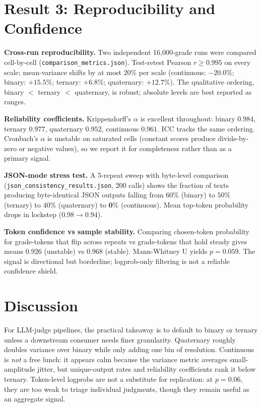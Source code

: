 \documentclass[11pt]{article}
\begin{document}
\section{Result 3: Reproducibility and Confidence}
\label{sec:r3}

\textbf{Cross-run reproducibility.} Two independent 16{,}000-grade runs were compared cell-by-cell (\texttt{comparison\_metrics.json}). Test-retest Pearson $r \geq 0.995$ on every scale; mean-variance shifts by at most $20\%$ per scale (continuous: $-20.0\%$; binary: $+15.5\%$; ternary: $+6.8\%$; quaternary: $+12.7\%$). The qualitative ordering, binary $<$ ternary $<$ quaternary, is robust; absolute levels are best reported as ranges.

\textbf{Reliability coefficients.} Krippendorff's $\alpha$ is excellent throughout: binary $0.984$, ternary $0.977$, quaternary $0.952$, continuous $0.961$. ICC tracks the same ordering. Cronbach's $\alpha$ is unstable on saturated cells (constant scores produce divide-by-zero or negative values), so we report it for completeness rather than as a primary signal.

\textbf{JSON-mode stress test.} A 5-repeat sweep with byte-level comparison (\texttt{json\_consistency\_results.json}, 200 calls) shows the fraction of texts producing byte-identical JSON outputs falling from $60\%$ (binary) to $50\%$ (ternary) to $40\%$ (quaternary) to $\mathbf{0\%}$ (continuous). Mean top-token probability drops in lockstep ($0.98 \rightarrow 0.94$).

\textbf{Token confidence vs sample stability.} Comparing chosen-token probability for grade-tokens that flip across repeats vs grade-tokens that hold steady gives means $0.926$ (unstable) vs $0.968$ (stable). Mann-Whitney U yields $p = 0.059$. The signal is directional but borderline; logprob-only filtering is not a reliable confidence shield.

\section{Discussion}
\label{sec:discussion}

For LLM-judge pipelines, the practical takeaway is to default to binary or ternary unless a downstream consumer needs finer granularity. Quaternary roughly doubles variance over binary while only adding one bin of resolution. Continuous is \emph{not} a free lunch: it appears calm because the variance metric averages small-amplitude jitter, but unique-output rates and reliability coefficients rank it below ternary. Token-level logprobs are not a substitute for replication: at $p = 0.06$, they are too weak to triage individual judgments, though they remain useful as an aggregate signal.
\end{document}
